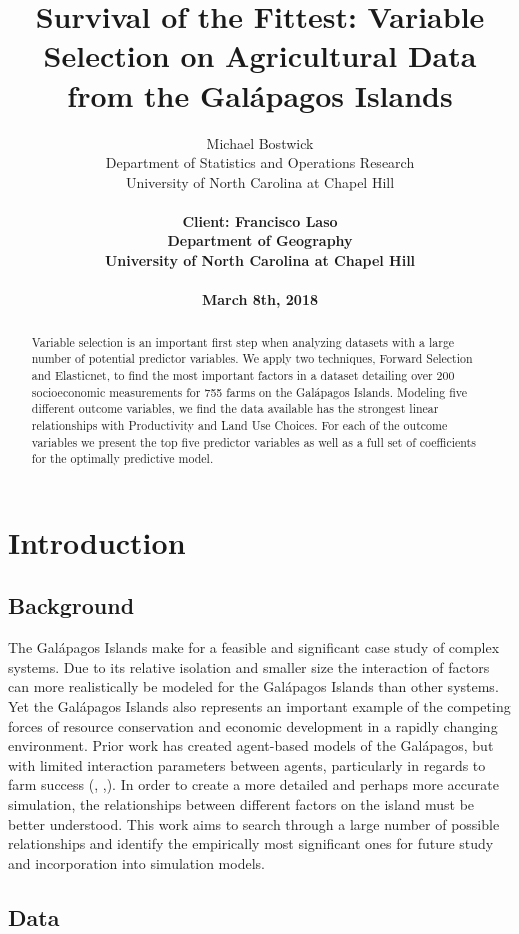 \documentclass{article}
\title{Survival of the Fittest: Variable Selection on Agricultural Data from the Gal\'apagos Islands}
\author{
  Michael Bostwick\\
  Department of Statistics and Operations Research\\
  University of North Carolina at Chapel Hill\\
	\\
  \bf{Client: Francisco Laso} \\
  Department of Geography \\
  University of North Carolina at Chapel Hill\\
  \\
  March 8th, 2018 \\
}
\begin{document}
\maketitle
\begin{abstract}
  Variable selection is an important first step when analyzing datasets with a large number of potential predictor variables. We 
  apply two techniques, Forward Selection and Elasticnet,  to find the most important factors in a dataset detailing over 200 
  socioeconomic measurements for 755 farms on the Gal\'apagos Islands. Modeling five different outcome variables, we find 
  the data available has the strongest linear relationships with Productivity and Land Use Choices. For each of the outcome 
  variables we present the top five predictor variables as well as a full set of coefficients for the optimally predictive model.
  \end{abstract}

\section{Introduction}

\subsection{Background}

The Gal\'apagos Islands make for a feasible and significant case study of complex systems. Due to its relative isolation and smaller size the interaction of factors can more realistically be modeled for the Gal\'apagos Islands than other systems. Yet the Gal\'apagos Islands also represents an important example of the competing forces of resource conservation and economic development in a rapidly changing environment. Prior work has created agent-based models of the Gal\'apagos, but with limited interaction parameters between agents, particularly in regards to farm success (\cite{miller}, \cite{valdivia},\cite{walsh}). In order to create a more detailed and perhaps more accurate simulation, the relationships between different factors on the island must be better understood. This work aims to search through a large number of possible relationships and identify the empirically most significant ones for future study and incorporation into simulation models. 

\subsection{Data}
\end{document}
